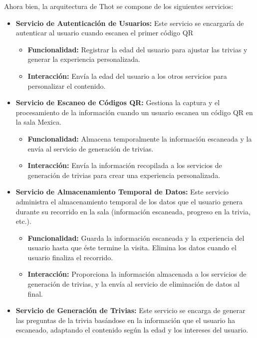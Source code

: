 \documentclass{report}
\begin{document}
Ahora bien, la arquitectura de Thot se compone de los siguientes servicios:
\begin{itemize}
    \item \textbf{Servicio de Autenticación de Usuarios:} Este servicio se encargaría de autenticar al usuario cuando escanea el primer código QR
    \begin{itemize}
        \item \textbf{Funcionalidad:} Registrar la edad del usuario para ajustar las trivias y generar la experiencia personalizada.
        \item \textbf{Interacción:} Envía la edad del usuario a los otros servicios para personalizar el contenido.
    \end{itemize}
    \item \textbf{Servicio de Escaneo de Códigos QR:} Gestiona la captura y el procesamiento de la información cuando un usuario escanea un código QR en la sala Mexica.
    \begin{itemize}
        \item \textbf{Funcionalidad:} Almacena temporalmente la información escaneada y la envía al servicio de generación de trivias.
        \item \textbf{Interacción:} Envía la información recopilada a los servicios de generación de trivias para crear una experiencia personalizada.
    \end{itemize}
    \item \textbf{Servicio de Almacenamiento Temporal de Datos:} Este servicio administra el almacenamiento temporal de los datos que el usuario genera durante su recorrido en la sala (información escaneada, progreso en la trivia, etc.).
    \begin{itemize}
        \item \textbf{Funcionalidad:} Guarda la información escaneada y la experiencia del usuario hasta que éste termine la visita. Elimina los datos cuando el usuario finaliza el recorrido.
        \item \textbf{Interacción:} Proporciona la información almacenada a los servicios de generación de trivias, y la envía al servicio de eliminación de datos al final.
    \end{itemize}
    \item \textbf{Servicio de Generación de Trivias:} Este servicio se encarga de generar las preguntas de la trivia basándose en la información que el usuario ha escaneado, adaptando el contenido según la edad y los intereses del usuario.
    \begin{itemize}

\end{itemize}
\end{itemize}
\end{document}
